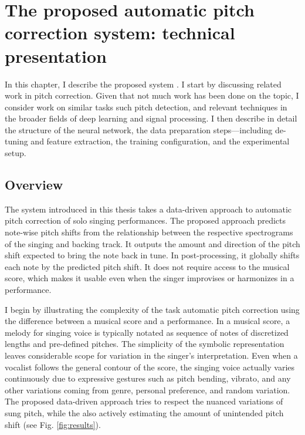 \chapter{The proposed automatic pitch correction system: technical presentation}
\label{chap:thesis-autotuner}
In this chapter, I describe the proposed system \cite{wager2020deep}. I start by discussing related work in pitch correction. Given that not much work has been done on the topic, I consider work on similar tasks such pitch detection, and relevant techniques in the broader fields of deep learning and signal processing. I then describe in detail the structure of the neural network, the data preparation steps---including de-tuning and feature extraction, the training configuration, and the experimental setup. 


\section{Overview}
The system introduced in this thesis takes a data-driven approach to automatic pitch correction of solo singing performances. The proposed approach predicts note-wise pitch shifts from the relationship between the respective spectrograms of the singing and backing track. It outputs the amount and direction of the pitch shift expected to bring the note back in tune. In post-processing, it globally shifts each note by the predicted pitch shift. It does not require access to the musical score, which makes it usable even when the singer improvises or harmonizes in a performance.

I begin by illustrating the complexity of the task automatic pitch correction using the difference between a musical score and a performance. In a musical score, a melody for singing voice is typically notated as sequence of notes of discretized lengths and pre-defined pitches. The simplicity of the symbolic representation leaves considerable scope for variation in the singer's interpretation. Even when a vocalist follows the general contour of the score, the singing voice actually varies continuously due to expressive gestures such as pitch bending, vibrato, and any other variations coming from genre, personal preference, and random variation. The proposed data-driven approach tries to respect the nuanced variations of sung pitch, while the also actively estimating the amount of unintended pitch shift (see Fig. \ref{fig:results}).

